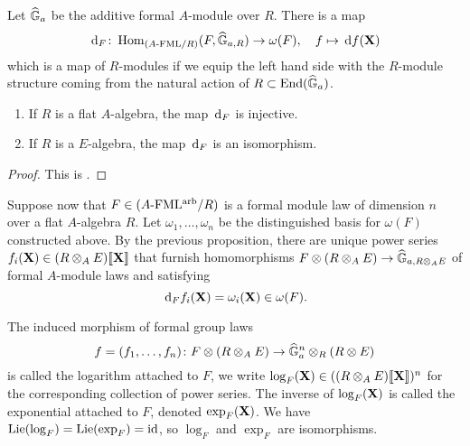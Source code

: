 \documentclass[../main.tex]{subfiles}
\begin{document}
Let $\widehat{\mathbb{G}}_a$ be the additive formal $A$-module over $R$. There is a map
\begin{equation} \label{eq:functorinvdifftohom}
  \, \mathrm{d}_{F} \colon  \operatorname{Hom}_{{({A}\text-\allowbreak\mathrm{FML}/{R})}} ({F}, \widehat{\mathbb{G}}_{a,R}) \to \omega({F}), \quad f \mapsto \, \mathrm{d} f(\mathbf{X})
\end{equation}
which is a map of $R$-modules if we equip the left hand side with the $R$-module
structure coming from the natural action of $R \subset \operatorname{End}(\widehat{\mathbb{G}}_a)$. 
\begin{prop}\label{prop:loginvdiff}
  \begin{enumerate}
    \item If $R$ is a flat $A$-algebra, the map $\, \mathrm{d}_F$ is injective.
    \item If $R$ is a $E$-algebra, the map $\, \mathrm{d}_F$ is an isomorphism.
  \end{enumerate}
\begin{proof}
  This is \cite[Proposition 3.2]{hopkins1994equivariant}.
\end{proof}
\end{prop}

Suppose now that $F \in {({A}\text-\allowbreak\mathrm{FML^{arb}}/{R})}$ is a formal module law of dimension $n$
over a flat $A$-algebra $R$. 
Let $\omega_1, \dots, \omega_n$ be the distinguished basis for $\omega(F)$
constructed above. 
By the previous proposition, there are unique power series 
$f_i(\mathbf{X}) \in (R \otimes_A E)\llbracket \mathbf{X} \rrbracket$ that furnish homomorphisms
$F \otimes (R \otimes_A E) \to \widehat{\mathbb{G}}_{a,R\otimes_AE}$ of formal $A$-module laws
and satisfying
\begin{equation*}
  \, \mathrm{d}_F f_i(\mathbf{X}) = \omega_i(\mathbf{X}) \in \omega(F).
\end{equation*}
\begin{defi}
  The induced morphism of formal group laws
  \begin{equation*}
    f = (f_1, \dots, f_n) \colon  F \otimes (R \otimes_A E) \to \widehat{\mathbb{G}}_a^n \otimes_R (R \otimes E)
  \end{equation*}
  is called the logarithm attached to $F$, we write 
  $\log_F(\mathbf{X}) \in ((R \otimes_A E)\llbracket \mathbf{X} \rrbracket)^n$ for the corresponding collection
  of power series. The inverse of $\log_F(\mathbf{X})$ is called the exponential 
  attached to $F$, denoted $\exp_F(\mathbf{X})$. We have $\operatorname{Lie}(\log_F) = \operatorname{Lie}(\exp_F) = \operatorname{id}$,
  so $\log_F$ and $\exp_F$ are isomorphisms.
\end{defi}
\end{document}
